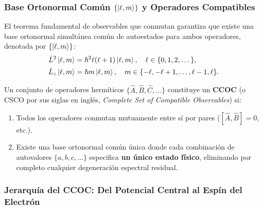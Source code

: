 \subsubsection{Base Ortonormal Común $\{\left| \ell, m \right\rangle\}$ y Operadores Compatibles}

El teorema fundamental de observables que conmutan garantiza que existe una base ortonormal simultánea común de autoestados para ambos operadores, denotada por $\{\left| \ell, m \right\rangle\}$:
\begin{align}
    \hat{L}^2 \left| \ell, m \right\rangle &= \hbar^2 \ell(\ell+1)\left| \ell, m \right\rangle, \quad \ell \in \{0, 1, 2, \dots\}, \label{eq:l2_eigenvalues} \\
    \hat{L}_z \left| \ell, m \right\rangle &= \hbar m \left| \ell, m \right\rangle, \quad m \in \{-\ell, -\ell+1, \dots, \ell-1, \ell\}. \label{eq:lz_eigenvalues}
\end{align}

\begin{teoremabox}
    Un conjunto de operadores hermíticos $\{\hat{A}, \hat{B}, \hat{C}, \dots\}$ constituye un \textbf{CCOC} (o CSCO por sus siglas en inglés, \textit{Complete Set of Compatible Observables}) si:
    \begin{enumerate}
        \item Todos los operadores conmutan mutuamente entre sí por pares ($[\hat{A}, \hat{B}] = 0$, etc.).
        \item Existe una base ortonormal común única donde cada combinación de autovalores $\{a, b, c, \dots\}$ especifica \textbf{un único estado físico}, eliminando por completo cualquier degeneración espectral residual.
    \end{enumerate}
\end{teoremabox}

\subsubsection{Jerarquía del CCOC: Del Potencial Central al Espín del Electrón}

